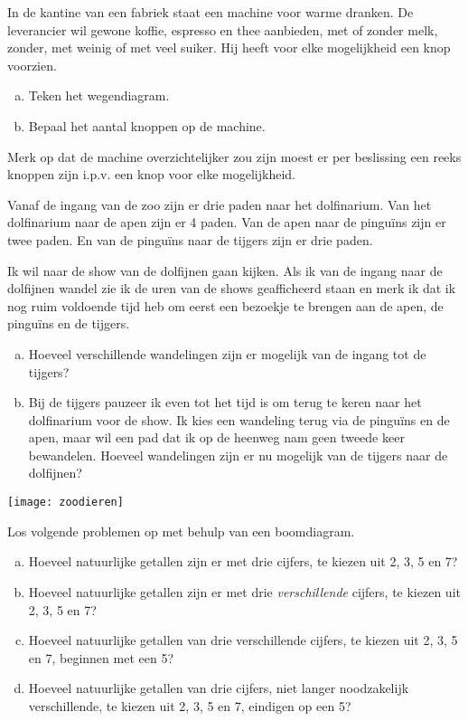 \documentclass[12pt,a4paper,twoside]{article}
\begin{document}
\begin{oefening}
In de kantine van een fabriek staat een machine voor warme dranken. De leverancier wil gewone koffie, espresso en thee aanbieden, met of zonder melk, zonder, met weinig of met veel suiker. Hij heeft voor elke mogelijkheid een knop voorzien.
\begin{enumerate}[(a)]
\item Teken het wegendiagram.
\item Bepaal het aantal knoppen op de machine.
\end{enumerate}
Merk op dat de machine overzichtelijker zou zijn moest er per beslissing een reeks knoppen zijn i.p.v. een knop voor elke mogelijkheid.
\end{oefening}

\begin{oefening}
Vanaf de ingang van de zoo zijn er drie paden naar het dolfinarium. Van het dolfinarium naar de apen zijn er 4 paden. Van de apen naar de pinguïns zijn er twee paden. En van de pinguïns naar de tijgers zijn er drie paden.

Ik wil naar de show van de dolfijnen gaan kijken. Als ik van de ingang naar de dolfijnen wandel zie ik de uren van de shows geafficheerd staan en merk ik dat ik nog ruim voldoende tijd heb om eerst een bezoekje te brengen aan de apen, de pinguïns en de tijgers.

\begin{enumerate}[(a)]
  \item Hoeveel verschillende wandelingen zijn er mogelijk van de ingang tot de tijgers?
  \item Bij de tijgers pauzeer ik even tot het tijd is om terug te keren naar het dolfinarium voor de show. Ik kies een wandeling terug via de pinguïns en de apen, maar wil een pad dat ik op de heenweg nam geen tweede keer bewandelen. Hoeveel wandelingen zijn er nu mogelijk van de tijgers naar de dolfijnen?
\end{enumerate}
\begin{center}
  \texttt{[image: zoodieren]}
\end{center}
\end{oefening}

\begin{oefening}
Los volgende problemen op met behulp van een boomdiagram.
\begin{enumerate}[(a)]
  \item Hoeveel natuurlijke getallen zijn er met drie cijfers, te kiezen uit 2, 3, 5 en 7?
  \item Hoeveel natuurlijke getallen zijn er met drie {\em verschillende} cijfers, te kiezen uit 2, 3, 5 en 7?
  \item Hoeveel natuurlijke getallen van drie verschillende cijfers, te kiezen uit 2, 3, 5 en 7, beginnen met een 5?
  \item Hoeveel natuurlijke getallen van drie cijfers, niet langer noodzakelijk verschillende, te kiezen uit 2, 3, 5 en 7, eindigen op een 5?
\end{enumerate}
\end{oefening}
\end{document}
